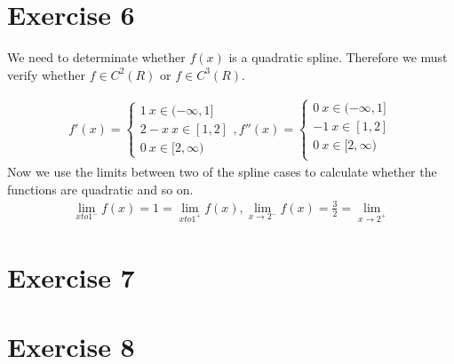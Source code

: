\section{Exercise 6}
We need to determinate whether $f(x)$ is a quadratic spline.
Therefore we must verify whether $f \in C^2(R)$ or $f \in C^3(R)$.

\begin{gather*}
f' (x) = \begin{cases}
1 ~ x \in (-\infty,1] \\
2-x ~ x \in [1,2] \\
0 ~ x\in [2,\infty)
\end{cases},
f''(x) =\begin{cases}
0 ~ x \in (-\infty,1] \\
-1 ~ x \in [1,2] \\
0 ~ x\in [2,\infty) \\
\end{cases}
\end{gather*}
Now we use the limits between two of the spline cases to calculate whether the functions are quadratic and so on.
\begin{gather*}
\lim_{x to 1^{-}} f(x) = 1 =  \lim_{x to 1^{+}} f(x) , \lim_{x \to 2^{-}} f(x) = \frac{3}{2} = \lim_{x \to 2^{+}}
\end{gather*}
\section{Exercise 7}
\section{Exercise 8}